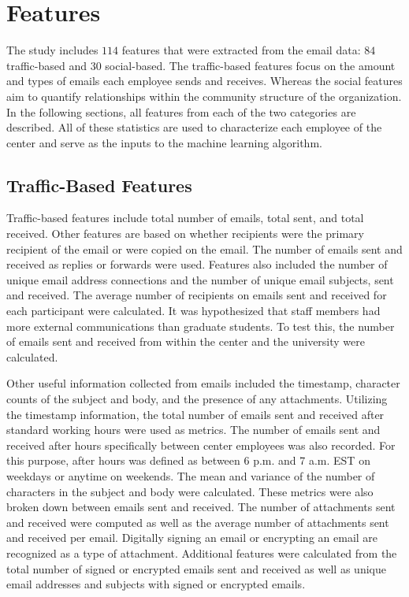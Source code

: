 \documentclass[10pt,twocolumn,conference]{IEEEtran}
\begin{document}
\section{Features} \label{Features}
The study includes $114$ features that were extracted from the email data: $84$ traffic-based and $30$ social-based.
The traffic-based features focus on the amount and types of emails each employee sends and receives.
Whereas the social features aim to quantify relationships within the community structure of the organization.
In the following sections, all features from each of the two categories are described. 
All of these statistics are used to characterize each employee of the center and serve as the inputs to the machine learning algorithm.

\subsection{Traffic-Based Features}
Traffic-based features include total number of emails, total sent, and total received.
Other features are based on whether recipients were the primary recipient of the email or were copied on the email.
The number of emails sent and received as replies or forwards were used.
Features also included the number of unique email address connections and the number of unique email subjects, sent and received.
The average number of recipients on emails sent and received for each participant were calculated.
It was hypothesized that staff members had more external communications than graduate students.
To test this, the number of emails sent and received from within the center and the university were calculated.  

Other useful information collected from emails included the timestamp, character counts of the subject and body, and the presence of any attachments.
Utilizing the timestamp information, the total number of emails sent and received after standard working hours were used as metrics.
The number of emails sent and received after hours specifically between center employees was also recorded.
For this purpose, after hours was defined as between 6 p.m. and 7 a.m. EST on weekdays or anytime on weekends.
The mean and variance of the number of characters in the subject and body were calculated.
These metrics were also broken down between emails sent and received.
The number of attachments sent and received were computed as well as the average number of attachments sent and received per email.
Digitally signing an email or encrypting an email are recognized as a type of attachment.
Additional features were calculated from the total number of signed or encrypted emails sent and received as well as unique email addresses and subjects with signed or encrypted emails.
\end{document}
